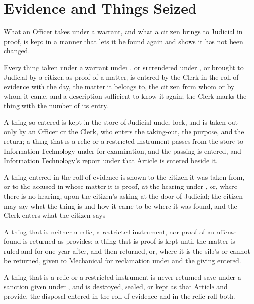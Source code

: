 \section{Evidence and Things Seized}
\label{sec:judicial:evidence-and-things-seized}

What an Officer takes under a warrant, and what a citizen brings to Judicial in proof, is kept in a manner that lets it be found again and shows it has not been changed.

\begin{clauses}
\item Every thing taken under a warrant under , or surrendered under , or brought to Judicial by a citizen as proof of a matter, is entered by the Clerk in the roll of evidence with the day, the matter it belongs to, the citizen from whom or by whom it came, and a description sufficient to know it again; the Clerk marks the thing with the number of its entry.
\item A thing so entered is kept in the store of Judicial under lock, and is taken out only by an Officer or the Clerk, who enters the taking-out, the purpose, and the return; a thing that is a relic or a restricted instrument passes from the store to Information Technology under  for examination, and the passing is entered, and Information Technology's report under that Article is entered beside it.
\item A thing entered in the roll of evidence is shown to the citizen it was taken from, or to the accused in whose matter it is proof, at the hearing under , or, where there is no hearing, upon the citizen's asking at the door of Judicial; the citizen may say what the thing is and how it came to be where it was found, and the Clerk enters what the citizen says.
\item A thing that is neither a relic, a restricted instrument, nor proof of an offense found is returned as  provides; a thing that is proof is kept until the matter is ruled and for one year after, and then returned, or, where it is the silo's or cannot be returned, given to Mechanical for reclamation under  and the giving entered.
\item A thing that is a relic or a restricted instrument is never returned save under a sanction given under , and is destroyed, sealed, or kept as that Article and  provide, the disposal entered in the roll of evidence and in the relic roll both.
\end{clauses}

